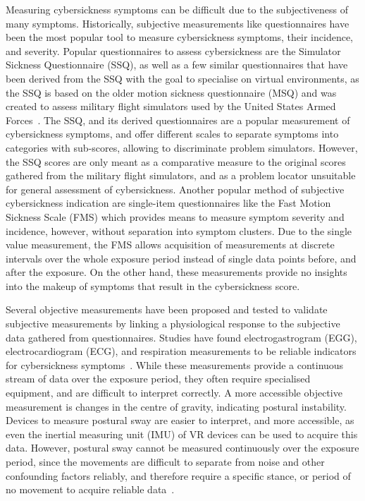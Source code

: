 Measuring cybersickness symptoms can be difficult due to the subjectiveness of many symptoms.
Historically, subjective measurements like questionnaires have been the most popular tool to measure cybersickness
symptoms, their incidence, and severity.
Popular questionnaires to assess cybersickness are the Simulator Sickness Questionnaire (SSQ), as well as a few
similar questionnaires that have been derived from the SSQ with the goal to specialise on virtual environments, as
the SSQ is based on the older motion sickness questionnaire (MSQ) and was created to assess military flight
simulators used by the United States Armed Forces~\cite{Kennedy1993}.
The SSQ, and its derived questionnaires are a popular measurement of cybersickness symptoms, and offer different
scales to separate symptoms into categories with sub-scores, allowing to discriminate problem simulators.
However, the SSQ scores are only meant as a comparative measure to the original scores gathered from the military
flight simulators, and as a problem locator unsuitable for general assessment of cybersickness.
Another popular method of subjective cybersickness indication are single-item questionnaires like the Fast Motion
Sickness Scale (FMS) which provides means to measure symptom severity and incidence, however, without separation into
symptom clusters.
Due to the single value measurement, the FMS allows acquisition of measurements at discrete intervals over the whole
exposure period instead of single data points before, and after the exposure.
On the other hand, these measurements provide no insights into the makeup of symptoms that result in the
cybersickness score.

Several objective measurements have been proposed and tested to validate subjective measurements by linking a
physiological response to the subjective data gathered from questionnaires.
Studies have found electrogastrogram (EGG), electrocardiogram (ECG), and respiration measurements to be reliable
indicators for cybersickness symptoms~\cite{Kim2005}.
While these measurements provide a continuous stream of data over the exposure period, they often require specialised
equipment, and are difficult to interpret correctly.
A more accessible objective measurement is changes in the centre of gravity, indicating postural instability.
Devices to measure postural sway are easier to interpret, and more accessible, as even the inertial measuring unit
(IMU) of VR devices can be used to acquire this data.
However, postural sway cannot be measured continuously over the exposure period, since the movements are difficult to
separate from noise and other confounding factors reliably, and therefore require a specific stance, or period of no
movement to acquire reliable data~\cite{Rebenitsch2016}.

